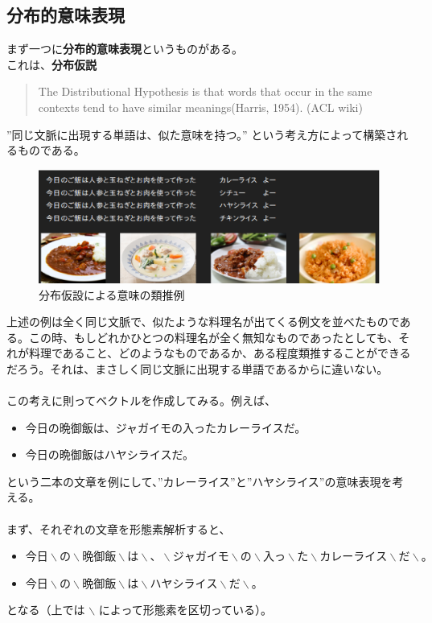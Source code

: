 \subsection{分布的意味表現}
まず一つに\textbf{分布的意味表現}というものがある。\\
これは、\textbf{分布仮説}
\begin{quote}
  The Distributional Hypothesis is that words that occur in the same contexts tend to have similar meanings(Harris, 1954). (ACL wiki)
\end{quote}
”同じ文脈に出現する単語は、似た意味を持つ。”
という考え方によって構築されるものである。\cite{JRFirth}

\begin{figure}[h]
  \centering
  \includegraphics[width=15cm]{../images/kyou_gohan.eps}
  \caption{分布仮設による意味の類推例}
\end{figure}

上述の例は全く同じ文脈で、似たような料理名が出てくる例文を並べたものである。この時、もしどれかひとつの料理名が全く無知なものであったとしても、それが料理であること、どのようなものであるか、ある程度類推することができるだろう。それは、まさしく同じ文脈に出現する単語であるからに違いない。\\
\\
この考えに則ってベクトルを作成してみる。例えば、
\begin{itemize}
  \item 今日の晩御飯は、ジャガイモの入ったカレーライスだ。
  \item 今日の晩御飯はハヤシライスだ。
\end{itemize}
という二本の文章を例にして、”カレーライス”と”ハヤシライス”の意味表現を考える。\\
\\
まず、それぞれの文章を形態素解析すると、

\begin{itemize}
  \item $今日 \backslash の \backslash 晩御飯 \backslash は \backslash 、 \backslash ジャガイモ \backslash の \backslash 入っ \backslash た \backslash カレーライス \backslash だ \backslash 。$
  \item $今日 \backslash の \backslash 晩御飯 \backslash は \backslash ハヤシライス \backslash だ \backslash 。$
\end{itemize}
となる（上では $\backslash$ によって形態素を区切っている）。

